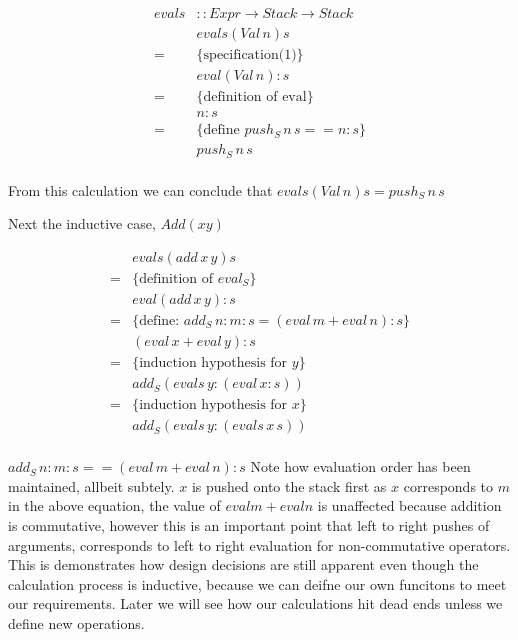 \documentclass {article}
\begin{document}
\newcommand{\pushs}{push_{S}}

\begin{eqnarray*}
	evals & :: Expr \rightarrow Stack \rightarrow Stack \\
		  & evals (Val \, n) s \\
	=	  & \{\mbox{specification(1)}\} \\
		  & eval (Val \, n):s \\ 
	=	  & \{\mbox{definition of eval}\} \\
		  & n:s \\
	=	  & \{\mbox{define $\pushs \, n \, s == n : s$}\} \\
		  & \pushs \, n \, s \\
\end{eqnarray*}

From this calculation we can conclude that \( evals (Val \, n) s = \pushs \, n \, s \)

Next the inductive case, $Add(x y)$

\newcommand{\adds}{add_{S}}

\begin{eqnarray*}
	     & evals (add \, x \, y) s \\
	=    & \{\mbox{definition of $eval_S$}\} \\
	     & eval (add \, x \, y):s	\\
	=    & \{\mbox{define: $\adds \, n:m:s 
			= (eval \, m + eval \, n): s$}\} \\
	     & (eval \, x + eval \,y):s \\
	=    & \{\mbox{induction hypothesis for $y$}\} \\
	     & \adds(evals \, y: (eval \, x:s)) \\
	=    & \{\mbox{induction hypothesis for $x$}\} \\
	     & \adds(evals \, y: (evals \, x \, s)) \\
\end{eqnarray*}

\( \adds \, n:m:s == (eval \, m + eval \, n): s \)
Note how evaluation order has been maintained, allbeit subtely. $x$ is pushed onto the stack first as $x$ corresponds to $m$ in the above equation,
the value of $eval m + eval n$ is unaffected because addition is commutative, however this is an important point that left to right pushes of arguments, corresponds to left to right evaluation for non-commutative operators.
This is demonstrates how design decisions are still apparent even though the calculation process is inductive, because we can deifne our own funcitons to meet our requirements.
Later we will see how our calculations hit dead ends unless we define new operations.
\end{document}
